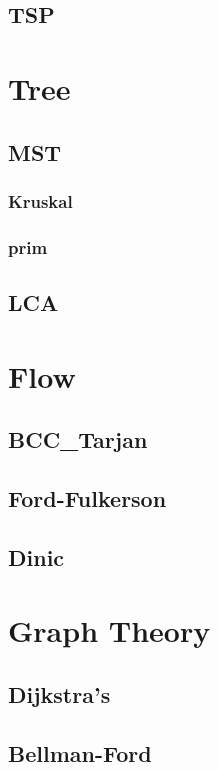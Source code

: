 	\subsection{TSP}
		
\section{Tree}
	\subsection{MST}
        \subsubsection{Kruskal}
            
        \subsubsection{prim}
            
	\subsection{LCA}
		
\section{Flow}
	\subsection{BCC\_Tarjan}
		
	\subsection{Ford-Fulkerson}
		
	\subsection{Dinic}
		
\section{Graph Theory}
	\subsection{Dijkstra’s}
		
	\subsection{Bellman-Ford}
		
